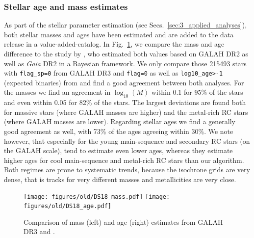 \documentclass[fleqn,usenatbib,useAMS]{mnras}
\newcommand{\Gaia}{\textit{Gaia}\xspace}
\begin{document}
\subsubsection{Stellar age and mass estimates}

As part of the stellar parameter estimation (see Secs.~\ref{sec:3_applied_analyses}), both stellar masses and ages have been estimated and are added to the data release in a value-added-catalog. In Fig.~\ref{fig:mass_age_sanders}, we compare the mass and age difference to the study by \citet{Sanders2018}, who estimated both values based on GALAH DR2   as well as \Gaia DR2 in a Bayesian framework. We only compare those 215493 stars with \texttt{flag\_sp=0} from GALAH DR3 and  \texttt{flag=0} as well as \texttt{log10\_age>-1} (expected binaries) from \citet{Sanders2018} and find a good agreement between both analyses. For the masses we find an agreement in $\log_{10} (M)$ within 0.1 for 95\% of the stars and even within 0.05 for 82\% of the stars. The largest deviations are found both for massive stars (where GALAH masses are higher) and the metal-rich RC stars (where GALAH masses are lower). Regarding stellar ages we find a generally good agreement as well, with 73\% of the ages agreeing within 30\%. We note however, that especially for the young main-sequence and secondary RC stars  (on the GALAH scale), \citet{Sanders2018} tend to estimate even lower ages, whereas they estimate higher ages for cool main-sequence and metal-rich RC stars than our algorithm. Both regimes are prone to systematic trends, because the isochrone grids are very dense, that is tracks for very different masses and metallicities are very close.

\begin{figure}
\centering
\texttt{[image: figures/old/DS18\_mass.pdf]}
\texttt{[image: figures/old/DS18\_age.pdf]}
  \caption[{Comparison of mass (left) and age (right) estimates from GALAH DR3 and \citet{Sanders2018}.}]{Comparison of mass (left) and age (right) estimates from GALAH DR3 and \citet{Sanders2018}.}
  \label{fig:mass_age_sanders}
\end{figure}
\end{document}
